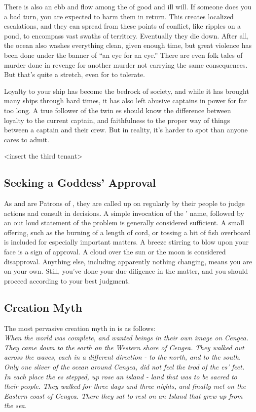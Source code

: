 \documentclass[blue]{GL2020}
\begin{document}
There is also an ebb and flow among the \pShippies{} of good and ill will. If someone does you a bad turn, you are expected to harm them in return. This creates localized escalations, and they can spread from these points of conflict, like ripples on a pond, to encompass vast swaths of \pShip{} territory. Eventually they die down. After all, the ocean also washes everything clean, given enough time, but great violence has been done under the banner of ``an eye for an eye.'' There are even folk tales of murder done in revenge for another murder not carrying the same consequences. But that's quite a stretch, even for \cEbb{} to tolerate.

Loyalty to your ship has become the bedrock of society, and while it has brought many ships through hard times, it has also left abusive captains in power for far too long. A true follower of the twin \cEbb{\God}es should know the difference between loyalty to the current captain, and faithfulness to the proper way of things between a captain and their crew. But in reality, it's harder to spot than anyone cares to admit.

<insert the third tenant>

\subsection*{Seeking a Goddess' Approval}
As \cEbb{} and \cFlow{} are Patrons of \pShip{}, they are called up on regularly by their people to judge actions and consult in decisions. A simple invocation of the \cEbb{\God}' name, followed by an out loud statement of the problem is generally considered sufficient. A small offering, such as the burning of a length of cord, or tossing a bit of fish overboard is included for especially important matters. A breeze stirring to blow upon your face is a sign of approval. A cloud over the sun or the moon is considered disapproval. Anything else, including apparently nothing changing, means you are on your own. Still, you've done your due diligence in the matter, and you should proceed according to your best judgment.

\subsection*{Creation Myth}
The most pervasive creation myth in \pShip{} is as follows:\\
\emph{When the world was complete, \cEbb{} and \cFlow{} wanted beings in their own image on Cengea. They came down to the earth on the Western shore of Cengea. They walked out across the waves, each in a different direction - \cEbb{} to the north, and \cFlow{} to the south. Only one sliver of the ocean around Cengea, \pWod{} did not feel the trod of the \cEbb{\God}es' feet. In each place the \cEbb{\God}es stepped, up rose an island - land that was to be sacred to their people. They walked for three days and three nights, and finally met on the Eastern coast of Cengea. There they sat to rest on an Island that grew up from the sea.}
\end{document}
